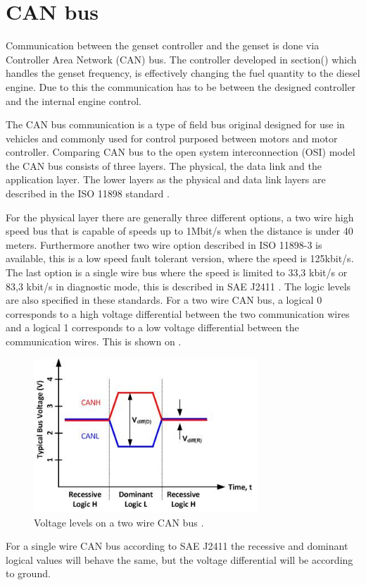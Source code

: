 \section{CAN bus}
\label{sec:Canbus}

Communication between the genset controller and the genset is done via Controller Area Network (CAN) bus. The controller developed in section() which handles the genset frequency, is effectively changing the fuel quantity to the diesel engine. Due to this the communication has to be between the designed controller and the internal engine control.

The CAN bus communication is a type of field bus original designed for use in vehicles and commonly used for control purposed between motors and motor controller. Comparing CAN bus to the open system interconnection (OSI) model the CAN bus consists of three layers. The physical, the data link and the application layer. The lower layers as the physical and data link layers are described in the ISO 11898 standard \cite{CAN_whitepaper_NI}. 

For the physical layer there are generally three different options, a two wire high speed bus that is capable of speeds up to 1Mbit/s when the distance is under 40 meters. Furthermore another two wire option described in ISO 11898-3 is available, this is a low speed fault tolerant version, where the speed is 125kbit/s. The last option is a single wire bus where the speed is limited to 33,3 kbit/s or 83,3 kbit/s in diagnostic mode, this is described in SAE J2411 \cite{CAN_singlewire}.
The logic levels are also specified in these standards. For a two wire CAN bus, a logical 0 corresponds to a high voltage differential between the two communication wires and a logical 1 corresponds to a low voltage differential between the communication wires. This is shown on . 

\begin{figure}[H]
\centering
\includegraphics[width=0.75\textwidth]{rapport/billeder/CAN_voltage}
\caption{Voltage levels on a two wire CAN bus \cite{fig_CAN_V_levels}.}
\label{fig:CAN_voltage}
\end{figure}     
For a single wire CAN bus according to SAE J2411 the recessive and dominant logical values will behave the same, but the voltage differential will be according to ground. 

